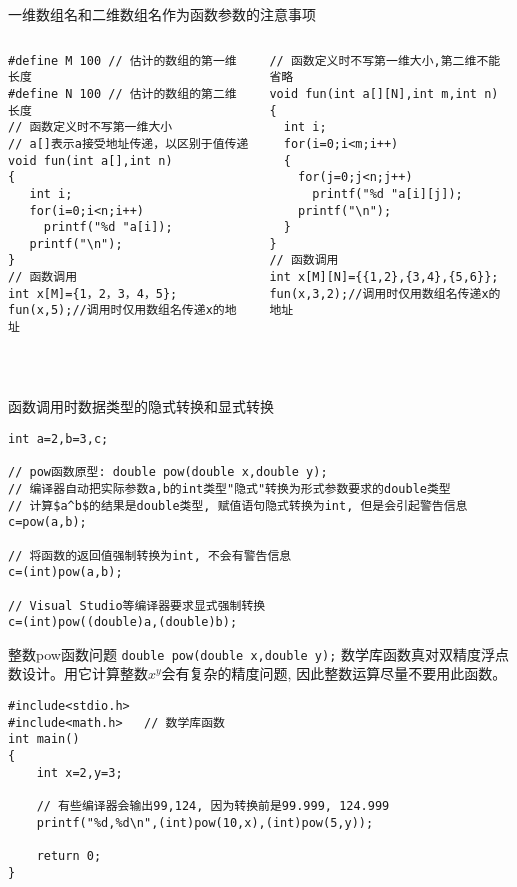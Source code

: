 \begin{frame}{一维数组名和二维数组名作为函数参数的注意事项}
\vspace{-0.4cm}
\begin{columns}[T]
\begin{lstlisting}
#define M 100 // 估计的数组的第一维长度
#define N 100 // 估计的数组的第二维长度
// 函数定义时不写第一维大小
// a[]表示a接受地址传递，以区别于值传递
void fun(int a[],int n)
{
   int i;
   for(i=0;i<n;i++) 
     printf("%d "a[i]);
   printf("\n");
}
// 函数调用
int x[M]={1，2，3，4，5};
fun(x,5);//调用时仅用数组名传递x的地址
\end{lstlisting}
\begin{lstlisting}[frame=leftline]
// 函数定义时不写第一维大小,第二维不能省略
void fun(int a[][N],int m,int n)
{
  int i;
  for(i=0;i<m;i++)
  {
    for(j=0;j<n;j++) 
      printf("%d "a[i][j]);
    printf("\n");
  }
}
// 函数调用
int x[M][N]={{1,2},{3,4},{5,6}};
fun(x,3,2);//调用时仅用数组名传递x的地址
\end{lstlisting}
\end{columns}
~\\
\end{frame}

\begin{frame}{函数调用时数据类型的隐式转换和显式转换}
\begin{lstlisting}
int a=2,b=3,c;

// pow函数原型: double pow(double x,double y);
// 编译器自动把实际参数a,b的int类型"隐式"转换为形式参数要求的double类型
// 计算$a^b$的结果是double类型, 赋值语句隐式转换为int, 但是会引起警告信息
c=pow(a,b);  

// 将函数的返回值强制转换为int, 不会有警告信息
c=(int)pow(a,b); 

// Visual Studio等编译器要求显式强制转换
c=(int)pow((double)a,(double)b); 

\end{lstlisting}
\end{frame}

\begin{frame}{整数pow函数问题}
\vspace{-0.3cm}
\lstinline|double pow(double x,double y);| 数学库函数真对双精度浮点数设计。用它计算整数$x^y$会有复杂的精度问题, 因此整数运算尽量不要用此函数。 
\begin{lstlisting}
#include<stdio.h>
#include<math.h>   // 数学库函数
int main()
{
	int x=2,y=3;
	
	// 有些编译器会输出99,124, 因为转换前是99.999, 124.999 
	printf("%d,%d\n",(int)pow(10,x),(int)pow(5,y)); 
		
	return 0;
}
\end{lstlisting}
\end{frame}

